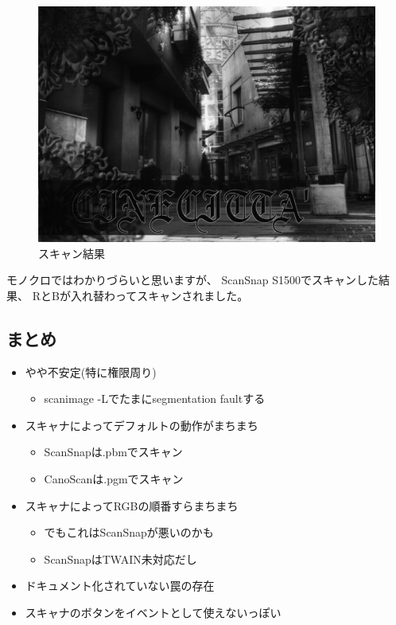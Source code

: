 \documentclass[mingoth,a4paper]{jsarticle}
\begin{document}
\begin{figure}[H]
\begin{center}
 \includegraphics[height=0.5\hsize] {image2011-natsu/dst02_mono.jpg}
 \caption{スキャン結果}
\label{fig:scan}
\end{center}
\end{figure}

モノクロではわかりづらいと思いますが、
ScanSnap S1500でスキャンした結果、
RとBが入れ替わってスキャンされました。

\subsection{まとめ}

\begin{itemize}
\item やや不安定(特に権限周り)
  \begin{itemize}
  \item scanimage -Lでたまにsegmentation faultする
  \end{itemize}
\item スキャナによってデフォルトの動作がまちまち
  \begin{itemize}
  \item ScanSnapは.pbmでスキャン
  \item CanoScanは.pgmでスキャン
  \end{itemize}
\item スキャナによってRGBの順番すらまちまち
  \begin{itemize}
    \item でもこれはScanSnapが悪いのかも
    \item ScanSnapはTWAIN未対応だし
  \end{itemize}
\item ドキュメント化されていない罠の存在
\item スキャナのボタンをイベントとして使えないっぽい
\end{itemize}
\end{document}
